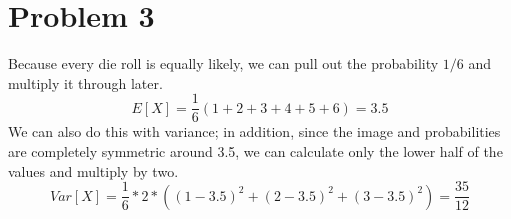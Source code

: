 \documentclass[11pt]{article}
\begin{document}
\section*{Problem 3}
Because every die roll is equally likely, we can pull out the probability $1/6$ and multiply it through later.
	\[E[X] = \dfrac{1}{6}( 1+2+3+4+5+6) = 3.5 \]
We can also do this with variance; in addition, since the image and probabilities are completely symmetric around 3.5, we can calculate only the lower half of the values and multiply by two.
	\[Var[X] = \dfrac{1}{6} * 2 * ( (1-3.5)^2 + (2 - 3.5)^2 + (3-3.5)^2 ) = \dfrac{35}{12} \]
	
\end{document}
